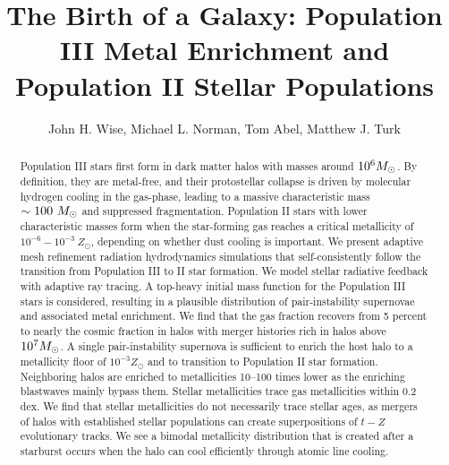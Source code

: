 \documentclass[apjl]{emulateapj}
\begin{document}

\title{The Birth of a Galaxy: Population III Metal Enrichment and
  Population II Stellar Populations}

\author{John H. Wise, 
  Michael L. Norman,
  Tom Abel,
  Matthew J. Turk}


\begin{abstract}

  Population III stars first form in dark matter halos with masses
  around $10^6 \Ms$.  By definition, they are metal-free, and their
  protostellar collapse is driven by molecular hydrogen cooling in the
  gas-phase, leading to a massive characteristic mass $\sim 100~\Ms$
  and suppressed fragmentation.  Population II stars with lower
  characteristic masses form when the star-forming gas reaches a
  critical metallicity of $10^{-6} - 10^{-3}~Z_\odot$, depending on
  whether dust cooling is important.  We present adaptive mesh
  refinement radiation hydrodynamics simulations that
  self-consistently follow the transition from Population III to II
  star formation.  We model stellar radiative feedback with adaptive
  ray tracing.  A top-heavy initial mass function for the Population
  III stars is considered, resulting in a plausible distribution of
  pair-instability supernovae and associated metal enrichment.  We
  find that the gas fraction recovers from 5 percent to nearly the
  cosmic fraction in halos with merger histories rich in halos above
  $10^7 \Ms$.  A single pair-instability supernova is sufficient to
  enrich the host halo to a metallicity floor of $10^{-3} Z_\odot$ and
  to transition to Population II star formation.  Neighboring halos
  are enriched to metallicities 10--100 times lower as the enriching
  blastwaves mainly bypass them.  Stellar metallicities trace gas
  metallicities within 0.2 dex.  We find that stellar metallicities do
  not necessarily trace stellar ages, as mergers of halos with
  established stellar populations can create superpositions of $t-Z$
  evolutionary tracks.  We see a bimodal metallicity distribution that
  is created after a starburst occurs when the halo can cool
  efficiently through atomic line cooling.

\end{abstract}
\end{document}
